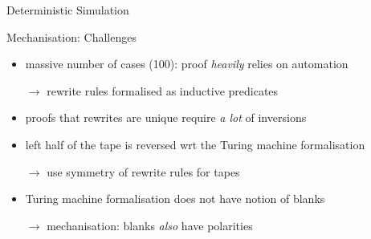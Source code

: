 \documentclass[11pt,usenames,dvipsnames,
hyperref={pdfencoding=auto,psdextra}]{beamer}
\begin{document}
\begin{frame}{Deterministic Simulation}
{\begin{center}
  \end{center}
}

\end{frame}

\begin{frame}{Mechanisation: Challenges}
  \begin{itemize}
    \item massive number of cases (100): proof \emph{heavily} relies on automation

      $\rightarrow$ rewrite rules formalised as inductive predicates
    \item proofs that rewrites are unique require \emph{a lot} of inversions
    \item left half of the tape is reversed wrt the Turing machine formalisation

      $\rightarrow$ use symmetry of rewrite rules for tapes
    \item Turing machine formalisation does not have notion of blanks

      $\rightarrow$ mechanisation: blanks \emph{also} have polarities
  \end{itemize}
\end{frame}
\end{document}
